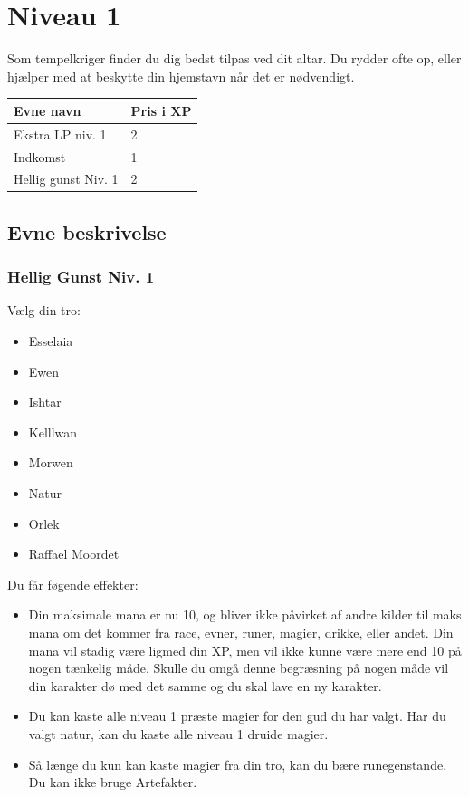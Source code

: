 \chapter{Niveau 1}
Som tempelkriger finder du dig bedst tilpas ved dit altar. Du rydder ofte op, eller hjælper med at beskytte din hjemstavn når det er nødvendigt.

\begin{table}[H]
    \centering
    \begin{tabular}{|p{}|p{}|}
    \rowcolor{cerulean!80}\hline
        Evne navn & Pris i XP \\\hline
        Ekstra LP niv. 1 &2\\\hline 
        Indkomst & 1\\\hline
        Hellig gunst Niv. 1 &2\\\hline
    \end{tabular}
\end{table}

\section{Evne beskrivelse}





\subsection{Hellig Gunst Niv. 1}
Vælg din tro: 
\begin{itemize}
    \item Esselaia
    \item Ewen
    \item Ishtar
    \item Kelllwan
    \item Morwen
    \item Natur
    \item Orlek
    \item Raffael Moordet
\end{itemize}

Du får føgende effekter:
\begin{itemize}
    \item Din maksimale mana er nu 10, og bliver ikke påvirket af andre kilder til maks mana om det kommer fra race, evner, runer, magier, drikke, eller andet. Din mana vil stadig være ligmed din XP, men vil ikke kunne være mere end 10 på nogen tænkelig måde. Skulle du omgå denne begræsning på nogen måde vil din karakter dø med det samme og du skal lave en ny karakter.
    \item Du kan kaste alle niveau 1 præste magier for den gud du har valgt. Har du valgt natur, kan du kaste alle niveau 1 druide magier.
    \item Så længe du kun kan kaste magier fra din tro, kan du bære runegenstande. Du kan ikke bruge Artefakter.
\end{itemize}